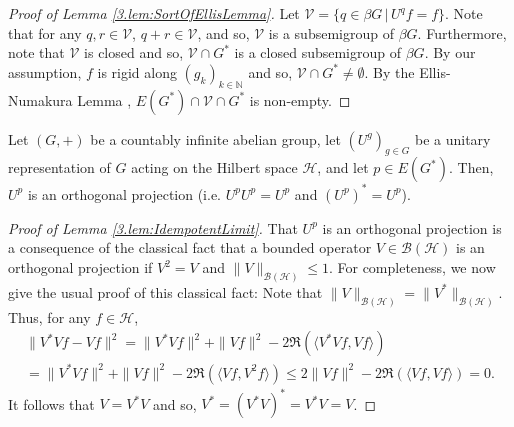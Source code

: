 \documentclass[graybox]{svmult}
\theoremstyle{definition}
\newcommand{\N}{\mathbb{N}}
\begin{document}
\begin{proof}[Proof of Lemma \ref{3.lem:SortOfEllisLemma}]
Let $\mathcal V=\{q\in \beta G\,|\,U^qf=f\}$. Note that for any $q,r\in \mathcal V$, $q+r\in\mathcal V$, and so, $\mathcal V$ is a subsemigroup of $\beta G$.
Furthermore, note that $\mathcal V$ is closed and so, $\mathcal V\cap G^*$ is a closed subsemigroup of $\beta G$. By our assumption, $f$ is rigid along $(g_k)_{k\in\N}$ and so, $\mathcal V\cap G^*\neq \emptyset$. By the Ellis-Numakura Lemma \cite[Theorem 2.5]{HBook}, $E(G^*)\cap \mathcal V\cap G^*$ is non-empty. 
\end{proof}
\begin{lemma}\label{3.lem:IdempotentLimit}
    Let $(G,+)$ be a countably infinite abelian group, let $(U^g)_{g\in G}$ be a unitary representation of $G$ acting on the Hilbert space $\mathcal H$, and let $p\in E(G^*)$. Then, $U^p$ is an orthogonal projection (i.e. $U^pU^p=U^p$ and $(U^p)^*=U^p$).
\end{lemma}
\begin{proof}[Proof of Lemma \ref{3.lem:IdempotentLimit}]
    That $U^p$ is an orthogonal projection is a consequence of the classical fact that a bounded operator $V\in \mathcal B(\mathcal H)$ is an orthogonal projection if $V^2=V$ and $\|V\|_{\mathcal B(\mathcal H)}\leq 1$. For completeness, we now give the usual proof of this classical fact: Note that $\|V\|_{\mathcal B(\mathcal H)}=\|V^*\|_{\mathcal B(\mathcal H)}$. Thus, for any $f\in\mathcal H$,
    \begin{multline*}
    \|V^*Vf-Vf\|^2=\|V^*Vf\|^2+\|Vf\|^2-2\Re(\langle V^*Vf,Vf\rangle)\\
     =\|V^*Vf\|^2+\|Vf\|^2-2\Re(\langle Vf,V^2f\rangle)\leq2\|Vf\|^2-2\Re(\langle Vf,Vf\rangle)=0. 
    \end{multline*}
    It follows that $V=V^*V$ and so, $V^*=(V^*V)^*=V^*V=V$.
\end{proof}
\end{document}
